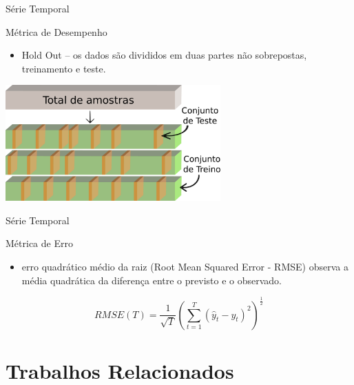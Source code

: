\documentclass[aspectratio=169]{beamer}
\begin{document}
\begin{frame}{Série Temporal}
\begin{block}{Métrica de Desempenho}
    \begin{itemize}
        \item Hold Out -- os dados são divididos em duas partes não sobrepostas, treinamento e teste.
        \end{itemize}
    
\end{block}
    \centering
\includegraphics[width=0.62\textwidth,angle=0]{holdout.pdf}
\end{frame}

\begin{frame}{Série Temporal}
\begin{block}{Métrica de Erro}
    \begin{itemize}
        \item erro quadrático médio da raiz (Root Mean Squared Error - RMSE) observa a média quadrática da diferença entre o previsto e o observado.
        \end{itemize}
    
\end{block}
\begin{equation}
RMSE(T) = \frac{1}{\sqrt{T}} (\sum_{t=1}^{T} (\hat{y}_t - y_t)^2)^\frac{1}{2}    
\end{equation}
\end{frame}

\section{Trabalhos Relacionados}
\end{document}
